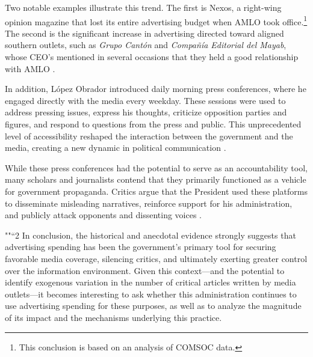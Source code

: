 Two notable examples illustrate this trend. The first is Nexos, a right-wing opinion magazine that lost its entire advertising budget when AMLO took office.\footnote{This conclusion is based on an analysis of COMSOC data.} The second is the significant increase in advertising directed toward aligned southern outlets, such as \textit{Grupo Cantón} and \textit{Compañía Editorial del Mayab}, whose CEO's mentioned in several occasions that they held a good relationship with AMLO \citep{Animal-Discrecionalidad}.

In addition, López Obrador introduced daily morning press conferences, where he engaged directly with the media every weekday. These sessions were used to address pressing issues, express his thoughts, criticize opposition parties and figures, and respond to questions from the press and public. This unprecedented level of accessibility reshaped the interaction between the government and the media, creating a new dynamic in political communication \citep{ThugMex-VictorHugo-JourPract}.

While these press conferences had the potential to serve as an accountability tool, many scholars and journalists contend that they primarily functioned as a vehicle for government propaganda. Critics argue that the President used these platforms to disseminate misleading narratives, reinforce support for his administration, and publicly attack opponents and dissenting voices \citep{OtrosDatos}. 

""“2 In conclusion, the historical and anecdotal evidence strongly suggests that advertising spending has been the government’s primary tool for securing favorable media coverage, silencing critics, and ultimately exerting greater control over the information environment. Given this context—and the potential to identify exogenous variation in the number of critical articles written by media outlets—it becomes interesting to ask whether this administration continues to use advertising spending for these purposes, as well as to analyze the magnitude of its impact and the mechanisms underlying this practice.